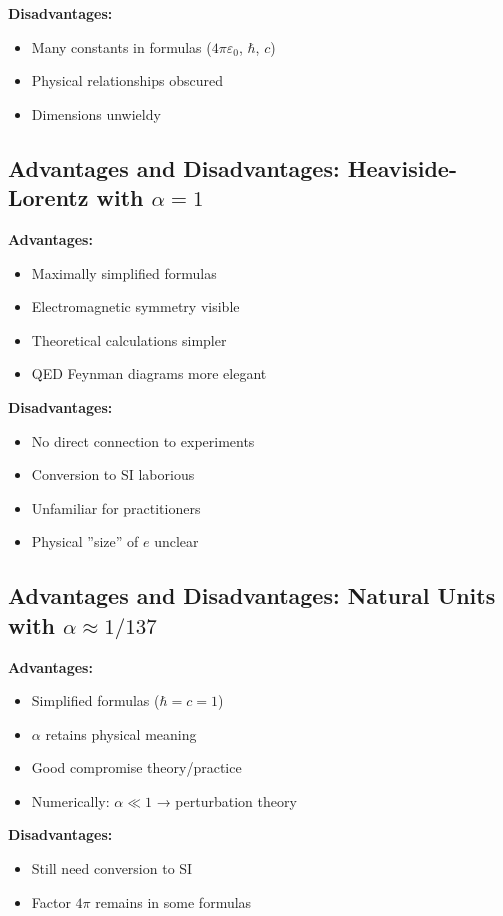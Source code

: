 	\textbf{Disadvantages:}
	\begin{itemize}
		\item Many constants in formulas ($4\pi\varepsilon_0$, $\hbar$, $c$)
		\item Physical relationships obscured
		\item Dimensions unwieldy
	\end{itemize}
	
	\subsection{Advantages and Disadvantages: Heaviside-Lorentz with $\alpha = 1$}
	
	\textbf{Advantages:}
	\begin{itemize}
		\item Maximally simplified formulas
		\item Electromagnetic symmetry visible
		\item Theoretical calculations simpler
		\item QED Feynman diagrams more elegant
	\end{itemize}
	
	\textbf{Disadvantages:}
	\begin{itemize}
		\item No direct connection to experiments
		\item Conversion to SI laborious
		\item Unfamiliar for practitioners
		\item Physical ''size'' of $e$ unclear
	\end{itemize}
	
	\subsection{Advantages and Disadvantages: Natural Units with $\alpha \approx 1/137$}
	
	\textbf{Advantages:}
	\begin{itemize}
		\item Simplified formulas ($\hbar = c = 1$)
		\item $\alpha$ retains physical meaning
		\item Good compromise theory/practice
		\item Numerically: $\alpha \ll 1$ → perturbation theory
	\end{itemize}
	
	\textbf{Disadvantages:}
	\begin{itemize}
		\item Still need conversion to SI
		\item Factor $4\pi$ remains in some formulas
	\end{itemize}
	
